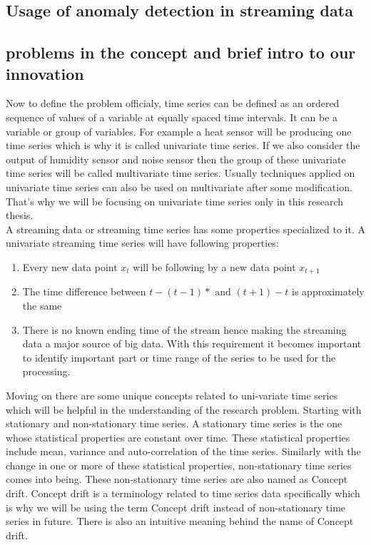 \documentclass[12pt]{article}
\begin{document}
\subsection{Usage of anomaly detection in streaming data}
\subsection{problems in the concept and brief intro to our innovation}
Now to define the problem officialy, time series can be defined as an ordered sequence of values of a variable at equally spaced time intervals. It can be a variable or group of variables. For example a heat sensor will be producing one time series which is why it is called univariate time series. If we also consider the output of humidity sensor and noise sensor then the group of these univariate time series will be called multivariate time series. Usually techniques applied on univariate time series can also be used on multivariate after some modification. That's why we will be focusing on univariate time series only in this research thesis. \\
\break
A streaming data or streaming time series has some properties specialized to it. A univariate streaming time series will have following properties:
\begin{enumerate}
	\item Every new data point $x_t$ will be following by a new data point $x_{t+1}$
	\item The time difference between $t - (t-1)*$ and $(t+1) - t$ is approximately the same
	\item There is no known ending time of the stream hence making the streaming data a major source of big data. With this requirement it becomes important to identify important part or time range of the series to be used for the processing.  
\end{enumerate}
Moving on there are some unique concepts related to uni-variate time series which will be helpful in the understanding of the research problem. Starting with stationary and non-stationary time series. A stationary time series is the one whose statistical properties are constant over time. These statistical properties include mean, variance and auto-correlation of the time series. Similarly with the change in one or more of these statistical properties, non-stationary time series comes into being. These non-stationary time series are also named as Concept drift. Concept drift is a terminology related to time series data specifically which is why we will be using the term Concept drift instead of non-stationary time series in future. There is also an intuitive meaning behind the name of Concept drift.\\
\end{document}
